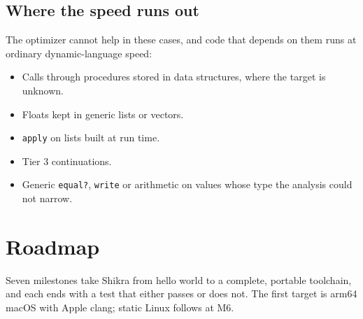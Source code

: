 \documentclass[a4paper,11pt]{article}
\begin{document}
\subsection{Where the speed runs out}

The optimizer cannot help in these cases, and code that depends on them runs
at ordinary dynamic-language speed:

\begin{itemize}
\item Calls through procedures stored in data structures, where the target
  is unknown.
\item Floats kept in generic lists or vectors.
\item \texttt{apply} on lists built at run time.
\item Tier 3 continuations.
\item Generic \texttt{equal?}, \texttt{write} or arithmetic on values whose
  type the analysis could not narrow.
\end{itemize}

\section{Roadmap}

Seven milestones take Shikra from hello world to a complete, portable
toolchain, and each ends with a test that either passes or does not. The
first target is arm64 macOS with Apple clang; static Linux follows at M6.
\end{document}
